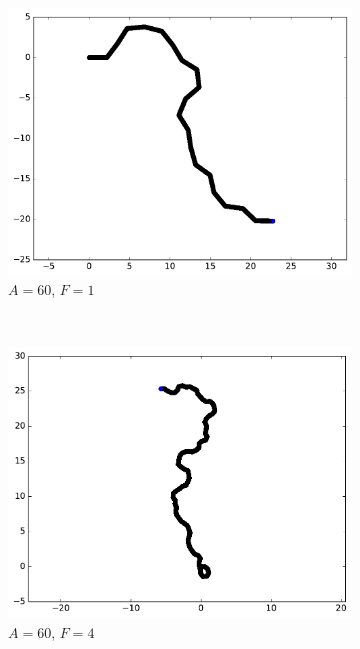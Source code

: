 \begin{appendices}
\begin{figure}[htbp]
\begin{subfigure}[t]{\subImgWmo}
			\includegraphics[width=\textwidth]{figures/ch3/synTraj_219_60_1}
			\caption[$A = 60$, $F=1$]{$A = 60$, $F=1$}
			\label{fig:synTraj_219_60_1}
		\end{subfigure}
		~
		\begin{subfigure}[t]{\subImgWmo}
			\centering
			\includegraphics[width=\textwidth]{figures/ch3/synTraj_219_60_4}
			\caption[$A = 60$, $F=4$]{$A = 60$, $F=4$}
			\label{fig:synTraj_219_60_4}
		\end{subfigure}
		~
		\begin{subfigure}[t]{\subImgWmo}
			\centering

\end{subfigure}
\end{figure}
\end{appendices}

